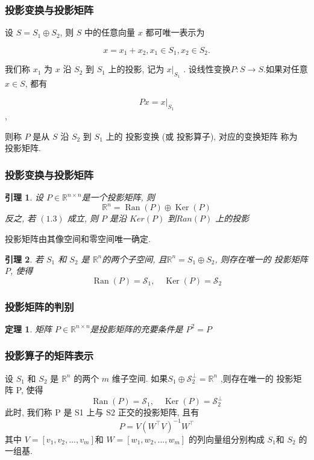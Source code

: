\documentclass[notheorems,serif]{beamer}
\newcommand{\hei}[1]{{\HEI#1}}
\newtheorem{theorem}{\hei{定理}}
\newtheorem{lemma}{\hei{引理}}
\begin{document}
\begin{frame}
\frametitle{投影变换与投影矩阵}
设 $S = S_1 \oplus S_2$, 则 $S$ 中的任意向量 $x$ 都可唯一表示为

$$x = x_1 + x_2, x_1 \in S_1, x_2 \in S_2.$$

我们称 $x_1$ 为 $x$ 沿 $S_2$ 到 $S_1$ 上的投影, 记为 $x|_{S_1}$
.
设线性变换$ P : S \to S. $如果对任意 $x \in S$, 都有

$$P x = x|_{S_1}$$,

则称 $P$ 是从 $S$ 沿 $S_2$ 到 $S_1$ 上的 投影变换 (或 投影算子), 对应的变换矩阵
称为 投影矩阵.
\end{frame}

\begin{frame}
\frametitle{投影变换与投影矩阵}
\begin{lemma}
	设 $P \in \mathbb{R}^{n×n} $是一个投影矩阵, 则
	\begin{equation}
	\mathbb{R}^{n}=\operatorname{Ran}(P) \oplus \operatorname{Ker}(P)
	\end{equation}
	反之, 若 $(1.3)$ 成立, 则 $P$ 是沿 $Ker(P)$ 到$ Ran(P)$ 上的投影
\end{lemma}

投影矩阵由其像空间和零空间唯一确定.


\begin{lemma}
	若 $S_1$ 和 $S_2$ 是 $\mathbb{R}^n$的两个子空间, 且$ \mathbb{R}^n= S_1 ⊕ S_2$, 则存在唯一的
	投影矩阵 $P$, 使得
	$$
	\operatorname{Ran}(P)=\mathcal{S}_{1}, \quad \operatorname{Ker}(P)=\mathcal{S}_{2}
	$$
\end{lemma}
\end{frame}

\begin{frame}
\frametitle{投影矩阵的判别}
\begin{theorem}
	矩阵 $P \in\mathbb{R}^{n \times n}$是投影矩阵的充要条件是 $P^2=P$
\end{theorem}

\end{frame}

\begin{frame}
\frametitle{投影算子的矩阵表示}
设 $S_1$ 和 $S_2$ 是 $\mathbb{R}^n$ 的两个 $m$ 维子空间. 如果$S_{1} \oplus \mathcal{S}_{2}^{\perp}=\mathbb{R}^{n}$ ,则存在唯一的
投影矩阵 P, 使得
$$
\operatorname{Ran}(P)=\mathcal{S}_{1}, \quad \operatorname{Ker}(P)=\mathcal{S}_{2}^{\perp}
$$
此时, 我们称 P 是 S1 上与 S2 正交的投影矩阵, 且有
$$
P=V\left(W^{\top} V\right)^{-1} W^{\top}
$$
其中 $V = [v_1, v_2, . . . , v_m] $和 $W = [w_1, w_2, . . . , w_m]$ 的列向量组分别构成
$S_1 $和 $S_2$ 的一组基.
\end{frame}
\end{document}
